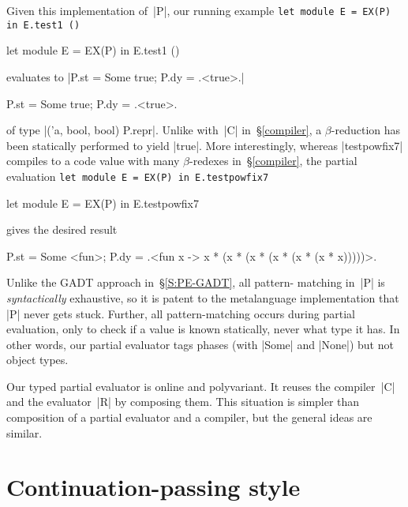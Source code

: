 Given this implementation of~|P|, our running example
\ifshort
\texttt{let module E = EX(P) in E.test1 ()}
\else
\begin{code}
let module E = EX(P) in E.test1 ()
\end{code}
\fi
evaluates to
\ifshort
|{P.st = Some true; P.dy = .<true>.}|
\else
\begin{code}
{P.st = Some true; P.dy = .<true>.}
\end{code}
\fi
of type |('a, bool, bool) P.repr|.  Unlike with~|C| in~\S\ref{compiler},
a $\beta$-reduction has been statically performed to yield |true|.  More
interestingly, whereas |testpowfix7| compiles to a code value with many
$\beta$-redexes in~\S\ref{compiler}, the partial evaluation
\ifshort
\texttt{let module E = EX(P) in E.testpowfix7}
\else
\begin{code}
let module E = EX(P) in E.testpowfix7
\end{code}
\fi
gives the desired result
\ifshort\vspace*{-0.7em}\fi
\begin{code}
{P.st = Some <fun>;
 P.dy = .<fun x -> x * (x * (x * (x * (x * (x * x)))))>.}
\end{code}
\ifshort\vspace*{-0.7em}\fi

\noindent Unlike the GADT approach in~\S\ref{S:PE-GADT}, all pattern\hyp
matching in~|P| is \emph{syntactically} exhaustive, so it is patent to the
metalanguage implementation that |P| never gets stuck.  Further, all
pattern\hyp matching occurs
during partial evaluation, only to check if a value is known statically,
never what type it has.  In other words, our partial evaluator tags
phases (with |Some| and |None|) but not object types.

\ifshort\else
Our typed partial evaluator is online and polyvariant.  It reuses the
compiler~|C| and the evaluator~|R| by composing them.  This situation is
simpler than  composition of a partial
evaluator and a compiler, but the general ideas are similar.
\fi


\ifshort\else
\section{Continuation\hyp passing style}\label{variations}

